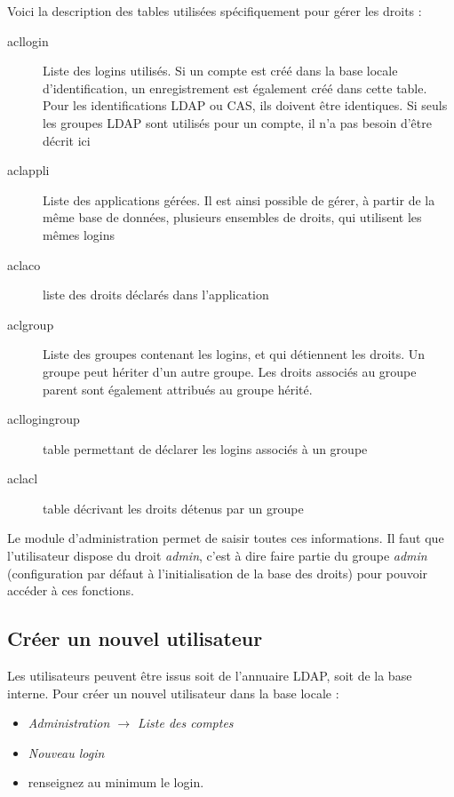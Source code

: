 Voici la description des tables utilisées spécifiquement pour gérer les droits :
\begin{description}
\item[acllogin] Liste des logins utilisés. Si un compte est créé dans la base locale d'identification, un enregistrement est également créé dans cette table. Pour les identifications LDAP ou CAS, ils doivent être identiques. Si seuls les groupes LDAP sont utilisés pour un compte, il n'a pas besoin d'être décrit ici
\item[aclappli] Liste des applications gérées. Il est ainsi possible de gérer, à partir de la même base de données, plusieurs ensembles de droits, qui utilisent les mêmes logins
\item[aclaco] liste des droits déclarés dans l'application
\item[aclgroup] Liste des groupes contenant les logins, et qui détiennent les droits. Un groupe peut hériter d'un autre groupe. Les droits associés au groupe parent sont également attribués au groupe hérité.
\item[acllogingroup] table permettant de déclarer les logins associés à un groupe
\item[aclacl] table décrivant les droits détenus par un groupe
\end{description}

Le module d'administration permet de saisir toutes ces informations. Il faut que l'utilisateur dispose du droit \textit{admin}, c'est à dire faire partie du groupe \textit{admin} (configuration par défaut à l'initialisation de la base des droits) pour pouvoir accéder à ces fonctions.

\subsection{Créer un nouvel utilisateur}

Les utilisateurs peuvent être issus soit de l'annuaire LDAP, soit de la base interne. 
Pour créer un nouvel utilisateur dans la base locale :
\begin{itemize}
\item \textit{Administration $\rightarrow$ Liste des comptes }
\item \textit{Nouveau login}
\item renseignez au minimum le login.
\end{itemize}


